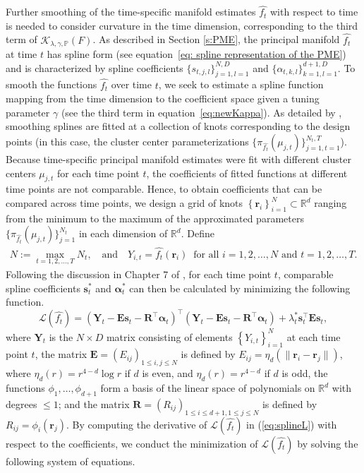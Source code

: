 \documentclass[12pt]{article}
\newcommand{\T}{\intercal}
\theoremstyle{definition}
\begin{document}
Further smoothing of the time-specific manifold estimates $\widehat{f_t}$ with respect to time is needed to consider curvature in the time dimension, corresponding to the third term of $\mathcal{K}_{\lambda, \gamma, \mathbb{P}}(F)$. As described in Section \ref{s:PME}, the principal manifold $\widehat{f_t}$ at time $t$ has spline form (see equation~\eqref{eq: spline representation of the PME}) and is characterized by spline coefficients $\{s_{t, j, l}\}_{j=1, l=1}^{N, D}$ and $\{\alpha_{t, k, l}\}_{k=1, l=1}^{d+1, D}$. To smooth the functions $\widehat{f_t}$ over time $t$, we seek to estimate a spline function mapping from the time dimension to the coefficient space given a tuning parameter $\gamma$ (see the third term in equation~\eqref{eq:newKappa}). As detailed by \cite{greenSilverman1994}, smoothing splines are fitted at a collection of knots corresponding to the design points (in this case, the cluster center parameterizations $\{\pi_{\widehat{f_t}}(\mu_{j, t})\}_{j=1, t=1}^{N_t, T}$). Because time-specific principal manifold estimates were fit with different cluster centers $\mu_{j, t}$ for each time point $t$, the coefficients of fitted functions at different time points are not comparable. Hence, to obtain coefficients that can be compared across time points, we design a grid of knots $\left\{\mathbf{r}_i\right\}_{i=1}^{N} \subset \mathbb{R}^d$ ranging from the minimum to the maximum of the approximated parameters $\{\pi_{\widehat{f_t}}(\mu_{j, t})\}_{j=1}^{N_t}$ in each dimension of $\mathbb{R}^d$. Define
\begin{align*}
    N:=\max_{t=1,2,\ldots,T} N_t,\ \ \ \text{ and }\ \ \ Y_{i,t}=\widehat{f_t}(\mathbf{r}_i)\ \text{ for all }i=1,2,\ldots,N \text{ and }t=1,2,\ldots,T.
\end{align*}
Following the discussion in Chapter 7 of \cite{greenSilverman1994}, for each time point $t$, comparable spline coefficients $\mathbf{s}_t^*$ and $\mathbf{\alpha}_t^*$ can then be calculated by minimizing the following function.
\begin{equation}\label{eq:splineL}
    \mathcal{L}(\widehat{f_t}) = (\mathbf{Y}_t - \mathbf{E}\mathbf{s}_t - \mathbf{R}^\T\mathbf{\alpha}_t)^\T(\mathbf{Y}_t - \mathbf{E}\mathbf{s}_t - \mathbf{R}^\T\mathbf{\alpha}_t) + \lambda_t^*\mathbf{s}_t^\T \mathbf{E}\mathbf{s}_t,
\end{equation}
where $\mathbf{Y}_t$ is the $N \times D$ matrix consisting of elements $\left\{Y_{i,t}\right\}_{i=1}^{N}$ at each time point $t$, the matrix $\mathbf{E}=(E_{ij})_{1\le i,j\le N}$ is defined by $E_{ij} = \eta_{d}(\|\mathbf{r}_i - \mathbf{r}_j\|)$, where $\eta_{d}(r) = r^{4 - d}\log r$ if $d$ is even, and $\eta_d(r) = r^{4-d}$ if $d$ is odd, the functions $\phi_1,\ldots,\phi_{d+1}$ form a basis of the linear space of polynomials on $\mathbb{R}^d$ with degrees $\le1$; and the matrix $\mathbf{R}=(R_{ij})_{1\le i\le d+1,1\le j\le N}$ is defined by $R_{ij} = \phi_i(\mathbf{r}_j)$. By computing the derivative of $\mathcal{L}(\widehat{f_t})$ in (\ref{eq:splineL}) with respect to the coefficients, we conduct the minimization of $\mathcal{L}(\widehat{f_t})$ by solving the following system of equations.
\end{document}
